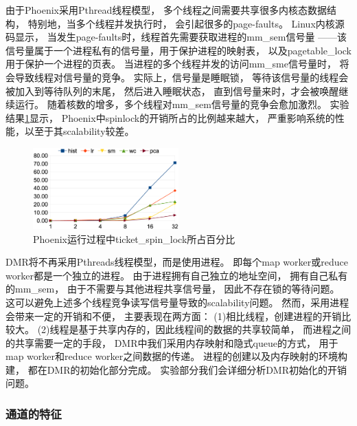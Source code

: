 由于Phoenix采用Pthread线程模型，
多个线程之间需要共享很多内核态数据结构，
特别地，当多个线程并发执行时，
会引起很多的page-faults。
Linux内核源码显示，
当发生page-faults时，线程首先需要获取进程的mm\_sem信号量
——该信号量属于一个进程私有的信号量，用于保护进程的映射表，
以及pagetable\_lock用于保护一个进程的页表。
当进程的多个线程并发的访问mm\_sme信号量时，
将会导致线程对信号量的竞争。
实际上，信号量是睡眠锁，
等待该信号量的线程会被加入到等待队列的末尾，
然后进入睡眠状态，
直到信号量来时，才会被唤醒继续运行。
随着核数的增多，多个线程对mm\_sem信号量的竞争会愈加激烈。
实验结果\ref{phoenix:spinlock}显示，
Phoenix中spinlock的开销所占的比例越来越大，
严重影响系统的性能，以至于其scalability较差。
\begin{figure}[!h!t]  
    \centering
    \includegraphics[width=0.5\textwidth]{img/phoenix_spinlock.eps}
    \caption{Phoenix运行过程中ticket\_spin\_lock所占百分比}
    \label{phoenix:spinlock}
\end{figure}

DMR将不再采用Pthreads线程模型，而是使用进程。
即每个map worker或reduce worker都是一个独立的进程。
由于进程拥有自己独立的地址空间，
拥有自己私有的mm\_sem，
由于不需要与其他进程共享信号量，
因此不存在锁的等待问题。
这可以避免上述多个线程竞争读写信号量导致的scalability问题。
然而，采用进程会带来一定的开销和不便，
主要表现在两方面：
(1)相比线程，创建进程的开销比较大。
(2)线程是基于共享内存的，因此线程间的数据的共享较简单，
而进程之间的共享需要一定的手段，
DMR中我们采用内存映射和隐式queue的方式，
用于map worker和reduce worker之间数据的传递。
进程的创建以及内存映射的环境构建，
都在DMR的初始化部分完成。
实验部分我们会详细分析DMR初始化的开销问题。

\subsubsection{通道的特征}
